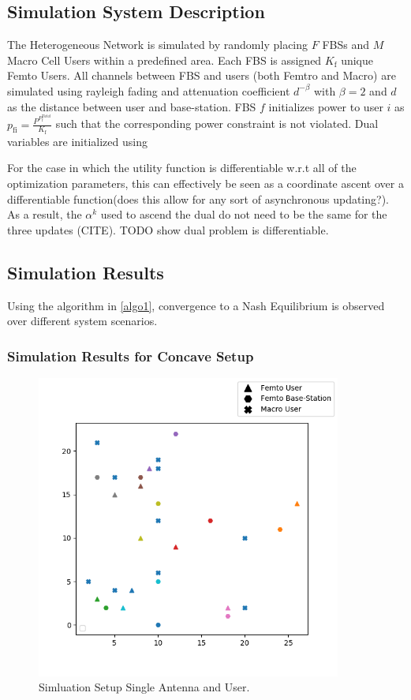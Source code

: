 \documentclass[12pt,a4paper]{report}
\begin{document}
\subsection{Simulation System Description}
The Heterogeneous Network is simulated by randomly placing $F$ FBSs and $M$ Macro Cell Users within a predefined area. Each FBS is assigned $K_{\mathrm{f}}$ unique Femto Users. All channels between FBS and users (both Femtro and Macro) are simulated using rayleigh fading and attenuation coefficient $d^{- \beta}$ with $\beta =2$ and $d$ as the distance between user and base-station.
FBS $f$ initializes power to user $i$ as $p_{\mathrm{fi}} = \frac{P^{P_{\mathrm{f}}^{Total}}}{K_{\mathrm{f}}} $ such that the corresponding power constraint is not violated. 
Dual variables are initialized using  
\par
For the case in which the utility function is differentiable w.r.t all of the optimization parameters, this can effectively be seen as a coordinate ascent over a differentiable function(does this allow for any sort of asynchronous updating?). As a result, the $\alpha^{k}$ used to ascend the dual do not need to be the same for the three updates (CITE).
TODO show dual problem is differentiable.


\subsection{Simulation Results}
Using the algorithm in \ref{algo1}, convergence to a Nash Equilibrium is observed over different system scenarios. 
\subsubsection{Simulation Results for Concave Setup}

\begin{figure}[H]
	\includegraphics[width=\textwidth,height = 10cm]{figures/system_figure_single}
	  \caption{Simluation Setup Single Antenna and User.  }
\end{figure}
\end{document}
